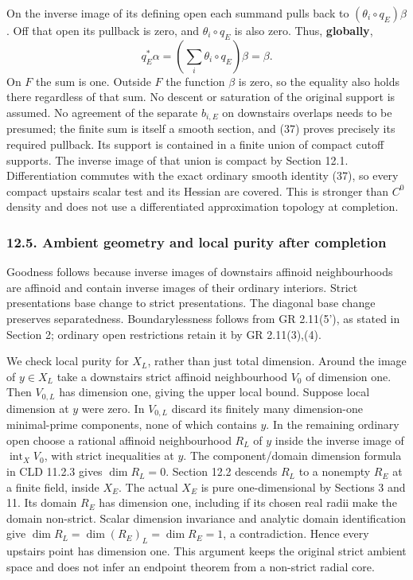 \documentclass[
  11pt,
]{article}
\begin{document}
On the inverse image of its defining open each summand pulls back to
\((\theta_i\circ q_E)\beta\). Off that open its pullback is zero, and
\(\theta_i\circ q_E\) is also zero. Thus, \textbf{globally}, \[
 q_E^*\alpha=(\sum_i\theta_i\circ q_E)\beta=\beta.       \tag{37}
\] On \(F\) the sum is one. Outside \(F\) the function \(\beta\) is
zero, so the equality also holds there regardless of that sum. No
descent or saturation of the original support is assumed. No agreement
of the separate \(b_{i,E}\) on downstairs overlaps needs to be presumed;
the finite sum is itself a smooth section, and (37) proves precisely its
required pullback. Its support is contained in a finite union of compact
cutoff supports. The inverse image of that union is compact by Section
12.1. Differentiation commutes with the exact ordinary smooth identity
(37), so every compact upstairs scalar test and its Hessian are covered.
This is stronger than \(C^0\) density and does not use a differentiated
approximation topology at completion.

\subsubsection{12.5. Ambient geometry and local purity after
completion}\label{ambient-geometry-and-local-purity-after-completion}

Goodness follows because inverse images of downstairs affinoid
neighbourhoods are affinoid and contain inverse images of their ordinary
interiors. Strict presentations base change to strict presentations. The
diagonal base change preserves separatedness. Boundarylessness follows
from GR 2.11(5'), as stated in Section 2; ordinary open restrictions
retain it by GR 2.11(3),(4).

We check local purity for \(X_L\), rather than just total dimension.
Around the image of \(y\in X_L\) take a downstairs strict affinoid
neighbourhood \(V_0\) of dimension one. Then \(V_{0,L}\) has dimension
one, giving the upper local bound. Suppose local dimension at \(y\) were
zero. In \(V_{0,L}\) discard its finitely many dimension-one
minimal-prime components, none of which contains \(y\). In the remaining
ordinary open choose a rational affinoid neighbourhood \(R_L\) of \(y\)
inside the inverse image of \(\operatorname{int}_X V_0\), with strict
inequalities at \(y\). The component/domain dimension formula in CLD
11.2.3 gives \(\dim R_L=0\). Section 12.2 descends \(R_L\) to a nonempty
\(R_E\) at a finite field, inside \(X_E\). The actual \(X_E\) is pure
one-dimensional by Sections 3 and 11. Its domain \(R_E\) has dimension
one, including if its chosen real radii make the domain non-strict.
Scalar dimension invariance and analytic domain identification give
\(\dim R_L=\dim(R_E)_L=\dim R_E=1\), a contradiction. Hence every
upstairs point has dimension one. This argument keeps the original
strict ambient space and does not infer an endpoint theorem from a
non-strict radial core.
\end{document}
